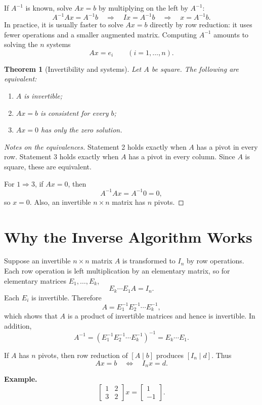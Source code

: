 \documentclass[11pt]{article}
\newtheorem*{theorem}{Theorem}
\begin{document}
If $A^{-1}$ is known, solve $Ax=b$ by multiplying on the left by $A^{-1}$:
\[
A^{-1}Ax=A^{-1}b
\quad\Longrightarrow\quad
Ix=A^{-1}b
\quad\Longrightarrow\quad
x=A^{-1}b.
\]
In practice, it is usually faster to solve $Ax=b$ directly by row reduction: it uses fewer operations and a smaller augmented matrix.  Computing $A^{-1}$ amounts to solving the $n$ systems
\[
Ax=e_i \qquad (i=1,\dots,n).
\]

\begin{theorem}[Invertibility and systems]
Let $A$ be square.  The following are equivalent:
\begin{enumerate}
  \item $A$ is invertible;
  \item $Ax=b$ is consistent for every $b$;
  \item $Ax=0$ has only the zero solution.
\end{enumerate}
\end{theorem}

\begin{proof}[Notes on the equivalences]
Statement 2 holds exactly when $A$ has a pivot in every row.  Statement 3 holds exactly when $A$ has a pivot in every column.  Since $A$ is square, these are equivalent.

For $1\Rightarrow3$, if $Ax=0$, then
\[
A^{-1}Ax=A^{-1}0=0,
\]
so $x=0$.  Also, an invertible $n\times n$ matrix has $n$ pivots.
\end{proof}

\clearpage
\section{Why the Inverse Algorithm Works}

Suppose an invertible $n\times n$ matrix $A$ is transformed to $I_n$ by row operations.  Each row operation is left multiplication by an elementary matrix, so for elementary matrices $E_1,\ldots,E_k$,
\[
E_k\cdots E_1A=I_n.
\]
Each $E_i$ is invertible.  Therefore
\[
A=E_1^{-1}E_2^{-1}\cdots E_k^{-1},
\]
which shows that $A$ is a product of invertible matrices and hence is invertible.  In addition,
\[
A^{-1}=(E_1^{-1}E_2^{-1}\cdots E_k^{-1})^{-1}=E_k\cdots E_1.
\]

If $A$ has $n$ pivots, then row reduction of $[A\mid b]$ produces $[I_n\mid d]$.  Thus
\[
Ax=b \quad\Longleftrightarrow\quad I_nx=d.
\]

\textbf{Example.}
\[
\begin{bmatrix}1&2\\3&2\end{bmatrix}x
=\begin{bmatrix}1\\-1\end{bmatrix}.
\]
\end{document}
